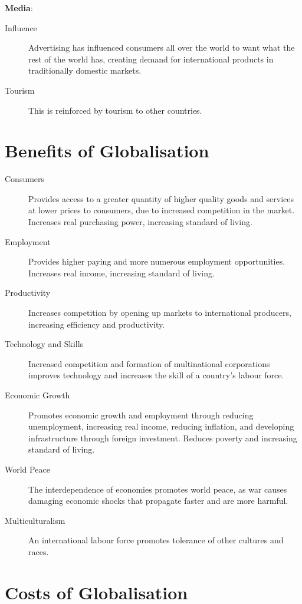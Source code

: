 \documentclass[a4paper,11pt]{report}
\begin{document}
\textbf{Media}:

\begin{description}
\item [Influence] Advertising has influenced consumers all over the world to
	want what the rest of the world has, creating demand for international
	products in traditionally domestic markets.
\item [Tourism] This is reinforced by tourism to other countries.
\end{description}


\section{Benefits of Globalisation}

\begin{description}
\item [Consumers] Provides access to a greater quantity of higher quality goods
	and services at lower prices to consumers, due to increased competition in
	the market.  Increases real purchasing power, increasing standard of living.
\item [Employment] Provides higher paying and more numerous employment
	opportunities. Increases real income, increasing standard of living.
\item [Productivity] Increases competition by opening up markets to
	international producers, increasing efficiency and productivity.
\item [Technology and Skills] Increased competition and formation of
	multinational corporations improves technology and increases the skill of a
	country's labour force.
\item [Economic Growth] Promotes economic growth and employment through
	reducing unemployment, increasing real income, reducing inflation, and
	developing infrastructure through foreign investment. Reduces poverty and
	increasing standard of living.
\item [World Peace] The interdependence of economies promotes world peace, as
	war causes damaging economic shocks that propagate faster and are more
	harmful.
\item [Multiculturalism] An international labour force promotes tolerance of
	other cultures and races.
\end{description}


\section{Costs of Globalisation}
\end{document}
